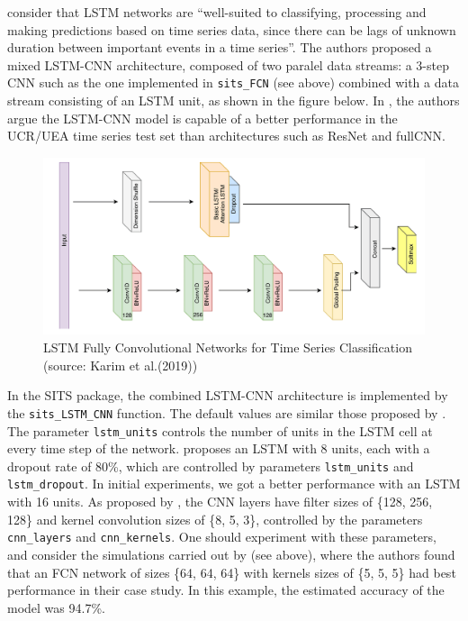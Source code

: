 \documentclass[a4paper,]{tufte-book}
\begin{document}
\citet{Karim2019} consider that LSTM networks are ``well-suited to classifying, processing and making predictions based on time series data, since there can be lags of unknown duration between important events in a time series''. The authors proposed a mixed LSTM-CNN architecture, composed of two paralel data streams: a 3-step CNN such as the one implemented in \texttt{sits\_FCN} (see above) combined with a data stream consisting of an LSTM unit, as shown in the figure below. In \citet{Karim2018}, the authors argue the LSTM-CNN model is capable of a better performance in the UCR/UEA time series test set than architectures such as ResNet and fullCNN.

\begin{figure}

{\centering \includegraphics[width=0.8\linewidth,height=0.8\textheight]{images/lstm-cnn} 

}

\caption[LSTM Fully Convolutional Networks for Time Series Classification (source]{LSTM Fully Convolutional Networks for Time Series Classification (source: Karim et al.(2019))}\label{fig:unnamed-chunk-61}
\end{figure}

In the SITS package, the combined LSTM-CNN architecture is implemented by the \texttt{sits\_LSTM\_CNN} function. The default values are similar those proposed by \citet{Karim2019}. The parameter \texttt{lstm\_units} controls the number of units in the LSTM cell at every time step of the network. \citet{Karim2019b} proposes an LSTM with 8 units, each with a dropout rate of 80\%, which are controlled by parameters \texttt{lstm\_units} and \texttt{lstm\_dropout}. In initial experiments, we got a better performance with an LSTM with 16 units. As proposed by \citet{Karim2019b}, the CNN layers have filter sizes of \{128, 256, 128\} and kernel convolution sizes of \{8, 5, 3\}, controlled by the parameters \texttt{cnn\_layers} and \texttt{cnn\_kernels}. One should experiment with these parameters, and consider the simulations carried out by \citet{Pelletier2019} (see above), where the authors found that an FCN network of sizes \{64, 64, 64\} with kernels sizes of \{5, 5, 5\} had best performance in their case study. In this example, the estimated accuracy of the model was 94.7\%.
\end{document}
